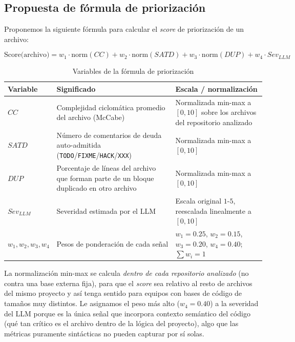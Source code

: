 \subsection{Propuesta de fórmula de priorización}
\label{sec:formula}

Proponemos la siguiente fórmula para calcular el \textit{score} de priorización de un archivo:

\begin{equation*}
\text{Score(archivo)} = w_1 \cdot \text{norm}(CC) + w_2 \cdot \text{norm}(SATD) + w_3 \cdot \text{norm}(DUP) + w_4 \cdot Sev_{LLM}
\end{equation*}

\begin{table}[H]
\centering
\caption{Variables de la fórmula de priorización}
\label{tab:formula}
\begin{tabular}{p{} p{} p{}}
\toprule
\textbf{Variable} & \textbf{Significado} & \textbf{Escala / normalización} \\
\midrule
$CC$ & Complejidad ciclomática promedio del archivo (McCabe) \parencite{McCabe1976} & Normalizada min-max a $[0,10]$ sobre los archivos del repositorio analizado \\[3pt]
$SATD$ & Número de comentarios de deuda auto-admitida (\texttt{TODO}/\texttt{FIXME}/\texttt{HACK}/\texttt{XXX}) \parencite{PotdarShihab2014} & Normalizada min-max a $[0,10]$ \\[3pt]
$DUP$ & Porcentaje de líneas del archivo que forman parte de un bloque duplicado en otro archivo & Normalizada min-max a $[0,10]$ \\[3pt]
$Sev_{LLM}$ & Severidad estimada por el LLM & Escala original $1$-$5$, reescalada linealmente a $[0,10]$ \\[3pt]
$w_1,w_2,w_3,w_4$ & Pesos de ponderación de cada señal & $w_1=0.25$, $w_2=0.15$, $w_3=0.20$, $w_4=0.40$; $\sum w_i = 1$ \\
\bottomrule
\end{tabular}
\end{table}

La normalización min-max se calcula \emph{dentro de cada repositorio analizado} (no contra una base externa fija), para que el \textit{score} sea relativo al resto de archivos del mismo proyecto y así tenga sentido para equipos con bases de código de tamaños muy distintos. Le asignamos el peso más alto ($w_4=0.40$) a la severidad del LLM porque es la única señal que incorpora contexto semántico del código (qué tan crítico es el archivo dentro de la lógica del proyecto), algo que las métricas puramente sintácticas no pueden capturar por sí solas.

